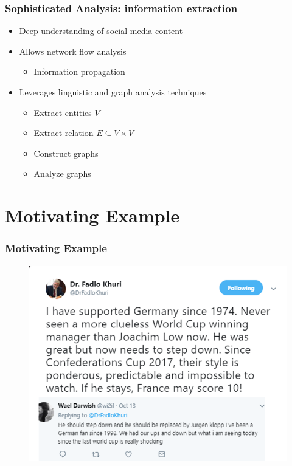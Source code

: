 \documentclass[xcolor=table]{beamer}
\begin{document}
\begin{frame}
\frametitle{Sophisticated Analysis: information extraction}
\begin{itemize}
\item Deep understanding of social media content
\item Allows network flow analysis
\begin{itemize}
\item Information propagation
\end{itemize}
\item Leverages linguistic and graph analysis techniques
\begin{itemize}
  \item Extract entities $V$
\item Extract relation $E \subseteq V \times V$
\item Construct graphs
\item Analyze graphs
\end{itemize}
\end{itemize}

\end{frame}
\section{Motivating Example}
\begin{frame}
\frametitle{Motivating Example}
\begin{figure}[!htb]
   \centering
    \includegraphics[scale=0.5]{img0004.png}
    
\end{figure}

\end{frame}
\end{document}
